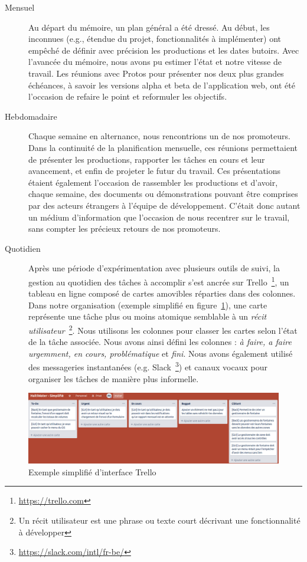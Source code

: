\documentclass{EPL-master-thesis-covers-FR}
\begin{document}
				\begin{description}
					\item[Mensuel] Au départ du mémoire, un plan général a été dressé. Au début, les inconnues (e.g., étendue du projet, fonctionnalités à implémenter) ont empêché de définir avec précision les productions et les dates butoirs. Avec l'avancée du mémoire, nous avons pu estimer l'état et notre vitesse de travail. Les réunions avec Protos pour présenter nos deux plus grandes échéances, à savoir les versions alpha et beta de l'application web, ont été l'occasion de refaire le point et reformuler les objectifs.

					\item[Hebdomadaire] Chaque semaine en alternance, nous rencontrions un de nos promoteurs. Dans la continuité de la planification mensuelle, ces réunions permettaient de présenter les productions, rapporter les tâches en cours et leur avancement, et enfin de projeter le futur du travail. Ces présentations étaient également l'occasion de rassembler les productions et d'avoir, chaque semaine, des documents ou démonstrations pouvant être comprises par des acteurs étrangers à l'équipe de développement. C'était donc autant un médium d'information que l'occasion de nous recentrer sur le travail, sans compter les précieux retours de nos promoteurs.

					\item[Quotidien] Après une période d'expérimentation avec plusieurs outils de suivi, la gestion au quotidien des tâches à accomplir s'est ancrée sur Trello~\footnote{\url{https://trello.com}}, un tableau en ligne composé de cartes amovibles réparties dans des colonnes. Dans notre organisation (exemple simplifié en figure~\ref{fig:screen_trello_simplifie}), une carte représente une tâche plus ou moins atomique semblable à un \emph{récit utilisateur}~\footnote{Un récit utilisateur est une phrase ou texte court décrivant une fonctionnalité à développer}. Nous utilisons les colonnes pour classer les cartes selon l'état de la tâche associée. Nous avons ainsi défini les colonnes : \emph{à faire, a faire urgemment, en cours, problématique} et \emph{fini}. Nous avons également utilisé des messageries instantanées (e.g. Slack~\footnote{\url{https://slack.com/intl/fr-be/}}) et canaux vocaux pour organiser les tâches de manière plus informelle.
				\end{description}

				\begin{figure}[H]
					\includegraphics[width=\textwidth]{images/screen_trello_simplifie}
					\caption{Exemple simplifié d'interface Trello}
					\label{fig:screen_trello_simplifie}
				\end{figure}
\end{document}
